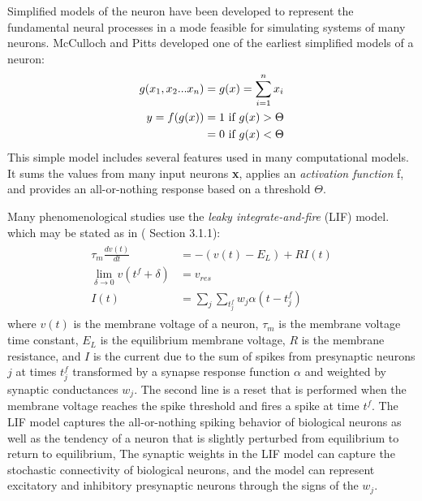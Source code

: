 Simplified models of the neuron have been developed to represent the fundamental neural processes in a mode feasible for simulating systems of many neurons.
McCulloch and Pitts\citep{McCulloch1943} developed one of the earliest simplified models of a neuron:
\begin{align}
  \begin{split}
    g(x_1,x_2...x_n) &= g(\boldmath{x})=\sum_{i=1}^n x_i \\
    y = f(g(x)) &= 1 \text{ if } g(x)>\Theta \\
		&= 0 \text{ if } g(x)<\Theta \\
  \end{split}
\end{align}
This simple model includes several features used in many computational models.
It sums the values from many input neurons \textbf{x}, applies an \textit{activation function} f, and provides an all-or-nothing response based on a threshold $\Theta$.

Many phenomenological studies use the \textit{leaky integrate-and-fire} (LIF) model\citep{Abbott1999}. which may be stated as in (\citet{Trappenberg2010} Section 3.1.1):
\begin{align}
  \begin{split}
    \tau_m \frac{dv(t)}{dt} &= -(v(t)-E_L) + RI(t) \\
    \displaystyle\lim_{\delta \rightarrow 0} v(t^f + \delta) &= v_{res}\\ 
    I(t) &= \sum_j \sum_{t^f_j}w_j\alpha(t-t^f_j)
  \end{split}
\end{align}
where $v(t)$ is the membrane voltage of a neuron, $\tau_m$ is the membrane voltage time constant, $E_L$ is the equilibrium membrane voltage, $R$ is the membrane resistance, and
$I$ is the current due to the sum of spikes from presynaptic neurons $j$ at times $t^f_j$ transformed by a synapse response function $\alpha$ and weighted by synaptic conductances $w_j$.
The second line is a reset that is performed when the membrane voltage reaches the spike threshold and fires a spike at time $t^f$.
The LIF model captures the all-or-nothing spiking behavior of biological neurons as well as the tendency of a neuron that is slightly perturbed from equilibrium to return to equilibrium,
The synaptic weights in the LIF model can capture the stochastic connectivity of biological neurons, and the model can represent excitatory and inhibitory presynaptic neurons through the signs of the $w_j$.

